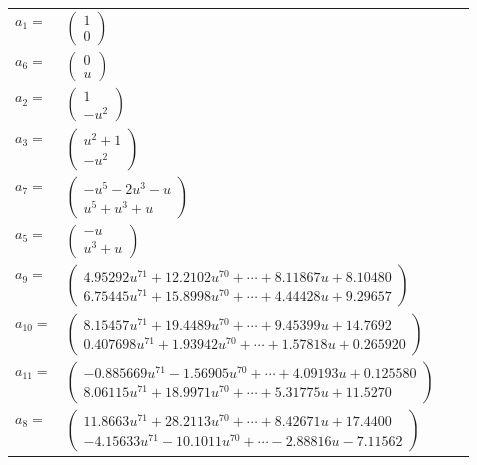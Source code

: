 \documentclass[1p]{elsarticle_modified}
\theoremstyle{definition}
\begin{document}
\begin{tabular}{m{7pt} m{180pt} m{7pt} m{180pt} }
\flushright $a_{1}=$&$\begin{pmatrix}1\\0\end{pmatrix}$ \\
\flushright $a_{6}=$&$\begin{pmatrix}0\\u\end{pmatrix}$ \\
\flushright $a_{2}=$&$\begin{pmatrix}1\\- u^2\end{pmatrix}$ \\
\flushright $a_{3}=$&$\begin{pmatrix}u^2+1\\- u^2\end{pmatrix}$ \\
\flushright $a_{7}=$&$\begin{pmatrix}- u^5-2 u^3- u\\u^5+u^3+u\end{pmatrix}$ \\
\flushright $a_{5}=$&$\begin{pmatrix}- u\\u^3+u\end{pmatrix}$ \\
\flushright $a_{9}=$&$\begin{pmatrix}4.95292 u^{71}+12.2102 u^{70}+\cdots+8.11867 u+8.10480\\6.75445 u^{71}+15.8998 u^{70}+\cdots+4.44428 u+9.29657\end{pmatrix}$ \\
\flushright $a_{10}=$&$\begin{pmatrix}8.15457 u^{71}+19.4489 u^{70}+\cdots+9.45399 u+14.7692\\0.407698 u^{71}+1.93942 u^{70}+\cdots+1.57818 u+0.265920\end{pmatrix}$ \\
\flushright $a_{11}=$&$\begin{pmatrix}-0.885669 u^{71}-1.56905 u^{70}+\cdots+4.09193 u+0.125580\\8.06115 u^{71}+18.9971 u^{70}+\cdots+5.31775 u+11.5270\end{pmatrix}$ \\
\flushright $a_{8}=$&$\begin{pmatrix}11.8663 u^{71}+28.2113 u^{70}+\cdots+8.42671 u+17.4400\\-4.15633 u^{71}-10.1011 u^{70}+\cdots-2.88816 u-7.11562\end{pmatrix}$ \\

\end{tabular}
\end{document}
